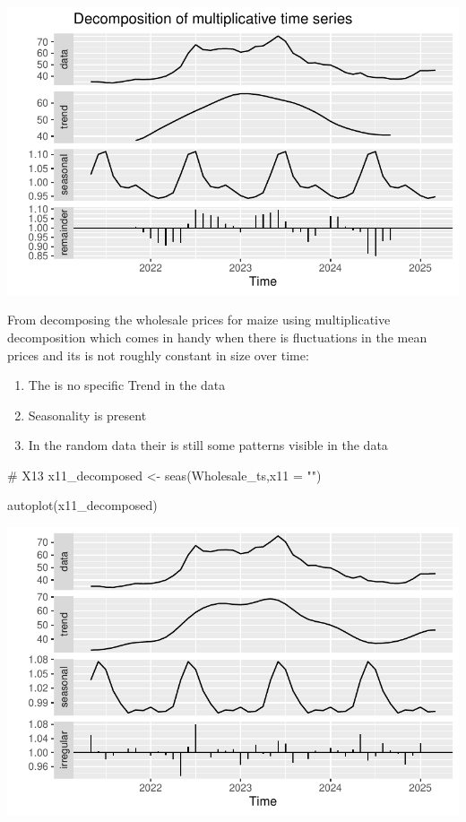 \documentclass[
  letterpaper,
  DIV=11,
  numbers=noendperiod]{scrartcl}
\newenvironment{Shaded}{\begin{snugshade}}{\end{snugshade}}
\newcommand{\AttributeTok}[1]{\textcolor[rgb]{0.40,0.45,0.13}{#1}}
\newcommand{\CommentTok}[1]{\textcolor[rgb]{0.37,0.37,0.37}{#1}}
\newcommand{\FunctionTok}[1]{\textcolor[rgb]{0.28,0.35,0.67}{#1}}
\newcommand{\NormalTok}[1]{\textcolor[rgb]{0.00,0.23,0.31}{#1}}
\newcommand{\OtherTok}[1]{\textcolor[rgb]{0.00,0.23,0.31}{#1}}
\newcommand{\StringTok}[1]{\textcolor[rgb]{0.13,0.47,0.30}{#1}}
\begin{document}
\includegraphics{Maize_analysis_files/figure-pdf/unnamed-chunk-17-1.pdf}

From decomposing the wholesale prices for maize using multiplicative
decomposition which comes in handy when there is fluctuations in the
mean prices and its is not roughly constant in size over time:

\begin{enumerate}
\def\labelenumi{\arabic{enumi}.}
\item
  The is no specific Trend in the data
\item
  Seasonality is present
\item
  In the random data their is still some patterns visible in the data
\end{enumerate}

\begin{Shaded}
\begin{Highlighting}[]
\CommentTok{\# X13}
\NormalTok{x11\_decomposed }\OtherTok{\textless{}{-}} \FunctionTok{seas}\NormalTok{(Wholesale\_ts,}\AttributeTok{x11 =} \StringTok{""}\NormalTok{)}

\FunctionTok{autoplot}\NormalTok{(x11\_decomposed)}
\end{Highlighting}
\end{Shaded}

\includegraphics{Maize_analysis_files/figure-pdf/unnamed-chunk-18-1.pdf}
\end{document}
